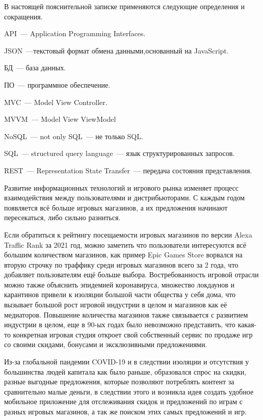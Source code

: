 \setcounter{page}{6}
В настоящей пояснительной записке применяются следующие определения и сокращения.

API~--- Application Programming Interfaces.

JSON~---текстовый формат обмена данными,основанный на JavaScript.

БД~--- база данных.

ПО~--- программное обеспечение.

MVC~--- Model View Controller.

MVVM~--- Model View ViewModel

NoSQL~--- not only SQL~--- не только SQL.

SQL~--- structured query language~--- язык структурированных запросов.

REST~--- Representation State Transfer~--- передача состояния представления.
\newpage


\label{sec:intro}

Развитие информационных технологий и игрового рынка изменяет процесс взаимодействия между пользователями и дистрибьюторами. С каждым годом появляется всё больше игровых магазинов, а их предложения начинают пересекаться, либо сильно разниться. 

Если обратиться к рейтингу посещаемости игровых магазинов по версии Alexa Traffic Rank за 2021 год, можно заметить что пользователи интересуются всё большим количеством магазинов, как пример Epic Games Store ворвался на вторую строчку по траффику среди игровых магазинов всего за 2 года, что добавляет пользователям ещё больше выбора.
Востребованность игровой отрасли можно также объяснить эпидемией коронавируса, множество локдаунов и карантинов привели к изоляции большой части общества у себя дома, что вызывает большой рост игровой индустрии в целом и магазинов как её медиаторов.
Повышение количества магазинов также связывается с развитием индустрии в целом, еще в 90-ых годах было невозможно представить, что какая-то конкретная игровая студия откроет свой собственный сервис по продаже игр со своими скидами, бонусами и эксклюзивными предложениями.

Из-за глобальной пандемии COVID-19 и в следствии изоляции и отсутствия у большинства людей капитала как было раньше, образовался спрос на скидки, разные выгодные предложения, которые позволяют потреблять контент за сравнительно малые деньги, в следствии этого и возникла идея создать удобное мобильное приложение для отслеживания скидок и предложений по играм с разных игровых магазинов, а так же поиском этих самых предложений и игр.